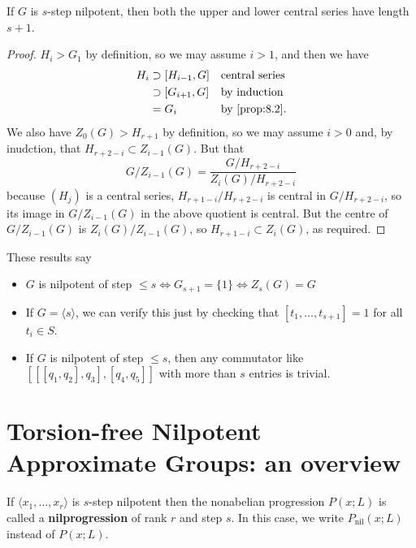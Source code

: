 \documentclass{article}
\newcommand{\named}[1]{\textbf{#1}\index{#1}}
\numberwithin{equation}{section}
\begin{document}
\begin{ncor}\label{cor:8.6}
  If $G$ is $s$-step nilpotent, then both the upper and lower central series have length $s+1$.
\end{ncor}
\begin{proof}
  $H_i > G_1$ by definition, so we may assume $i>1$, and then we have
  \begin{align*}
    H_i &\supset [H_{i-1},G] &&\text{central series} \\
        &\supset [G_{i+1},G] &&\text{by induction} \\
        &=G_i &&\text{by \cref{prop:8.2}}.
  \end{align*}
  We also have $Z_0(G) > H_{r+1}$ by definition, so we may assume $i > 0$ and, by inudction, that $H_{r+2-i} \subset Z_{i-1}(G)$.
  But that
  \begin{equation*}
    G/Z_{i-1}(G) = \frac{G/H_{r+2-i}}{Z_i(G)/H_{r+2-i}}
  \end{equation*}
  because $(H_j)$ is a central series, $H_{r+1-i}/H_{r+2-i}$ is central in $G/H_{r+2-i}$, so its image in $G/Z_{i-1}(G)$ in the above quotient is central.
  But the centre of $G/Z_{i-1}(G)$ is $Z_i(G)/Z_{i-1}(G)$, so $H_{r+1-i} \subset Z_i(G)$, as required.
\end{proof}

These results say
\begin{itemize}
  \item $G$ is nilpotent of step $\leq s \iff G_{s+1} = \{1\} \iff Z_s(G) = G$
  \item If $G = \langle s \rangle$, we can verify this just by checking that $[t_1, \dotsc, t_{s+1}] = 1$ for all $t_i \in S$.
  \item If $G$ is nilpotent of step $\leq s$, then any commutator like $[[[q_1, q_2], q_3], [q_4, q_5]]$ with more than $s$ entries is trivial.
\end{itemize}

\clearpage
\section{Torsion-free Nilpotent Approximate Groups: an overview}
\begin{defi}
  \newlec
  If $\langle x_1, \dotsc, x_r \rangle$ is $s$-step nilpotent then the nonabelian progression $P(x;L)$ is called a \named{nilprogression} of rank $r$ and step $s$.
  In this case, we write $P_{\text{nil}}(x;L)$ instead of $P(x;L)$.
\end{defi}
\end{document}
